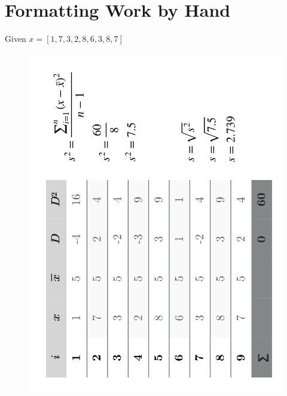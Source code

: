 \documentclass{tufte-handout}
\begin{document}
\newpage
\section*{Formatting Work by Hand}
Given $ x = [1,7,3,2,8,6,3,8,7]  $
\begin{fullwidth}
\begin{figure}[!h]
\includegraphics[scale=.54]{"workByHand"}
\end{figure}
\end{fullwidth}

\end{document}
